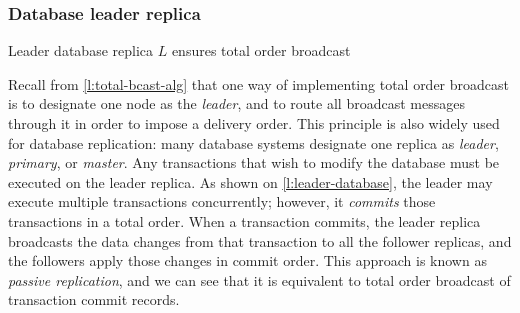 \begin{frame}
    \label{s:leader-database}
    \frametitle{Database leader replica}
    Leader database replica $L$ ensures total order broadcast
    \begin{center}
    \end{center}%
\end{frame}
\label{l:leader-database}

Recall from \autoref{l:total-bcast-alg} that one way of implementing total order broadcast is to designate one node as the \emph{leader}, and to route all broadcast messages through it in order to impose a delivery order.
This principle is also widely used for database replication: many database systems designate one replica as \emph{leader}, \emph{primary}, or \emph{master}.
Any transactions that wish to modify the database must be executed on the leader replica.
As shown on \autoref{l:leader-database}, the leader may execute multiple transactions concurrently; however, it \emph{commits} those transactions in a total order.
When a transaction commits, the leader replica broadcasts the data changes from that transaction to all the follower replicas, and the followers apply those changes in commit order.
This approach is known as \emph{passive replication}, and we can see that it is equivalent to total order broadcast of transaction commit records.

